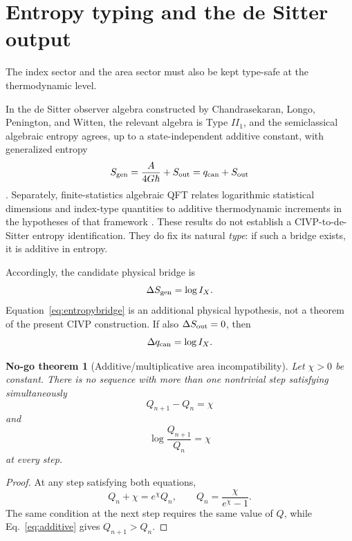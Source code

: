 \documentclass[aps,prd,preprint,nofootinbib,superscriptaddress]{revtex4-2}
\newtheorem{nogotheorem}[theorem]{No-go theorem}
\theoremstyle{definition}
\theoremstyle{remark}
\begin{document}
\section{Entropy typing and the de Sitter output}
\label{sec:entropy}

The index sector and the area sector must also be kept type-safe at the thermodynamic level.

In the de Sitter observer algebra constructed by Chandrasekaran, Longo, Penington, and Witten, the relevant algebra is Type $II_1$, and the semiclassical algebraic entropy agrees, up to a state-independent additive constant, with generalized entropy
\begin{equation}
S_{\rm gen}
=
\frac{A}{4G\hbar}
+
S_{\rm out}
=
q_{\rm can}+S_{\rm out}
\label{eq:Sgen}
\end{equation}
\cite{ChandrasekaranLongoPeningtonWitten2023}.  Separately, finite-statistics algebraic QFT relates logarithmic statistical dimensions and index-type quantities to additive thermodynamic increments in the hypotheses of that framework \cite{Longo2001}.  These results do not establish a CIVP-to-de-Sitter entropy identification.  They do fix its natural \emph{type}: if such a bridge exists, it is additive in entropy.

Accordingly, the candidate physical bridge is
\begin{equation}
\Delta S_{\rm gen}
=
\log I_X.
\label{eq:entropybridge}
\end{equation}
Equation~\eqref{eq:entropybridge} is an additional physical hypothesis, not a theorem of the present CIVP construction.  If also $\Delta S_{\rm out}=0$, then
\begin{equation}
\Delta q_{\rm can}=\log I_X.
\label{eq:additiveQ}
\end{equation}

\begin{nogotheorem}[Additive/multiplicative area incompatibility]
\label{thm:addmult}
Let $\chi>0$ be constant.  There is no sequence with more than one nontrivial step satisfying simultaneously
\begin{equation}
Q_{n+1}-Q_n=\chi
\label{eq:additive}
\end{equation}
and
\begin{equation}
\log\frac{Q_{n+1}}{Q_n}=\chi
\label{eq:multiplicative}
\end{equation}
at every step.
\end{nogotheorem}

\begin{proof}
At any step satisfying both equations,
\begin{equation}
Q_n+\chi=e^\chi Q_n,
\qquad
Q_n=\frac{\chi}{e^\chi-1}.
\end{equation}
The same condition at the next step requires the same value of $Q$, while Eq.~\eqref{eq:additive} gives $Q_{n+1}>Q_n$.
\end{proof}
\end{document}

